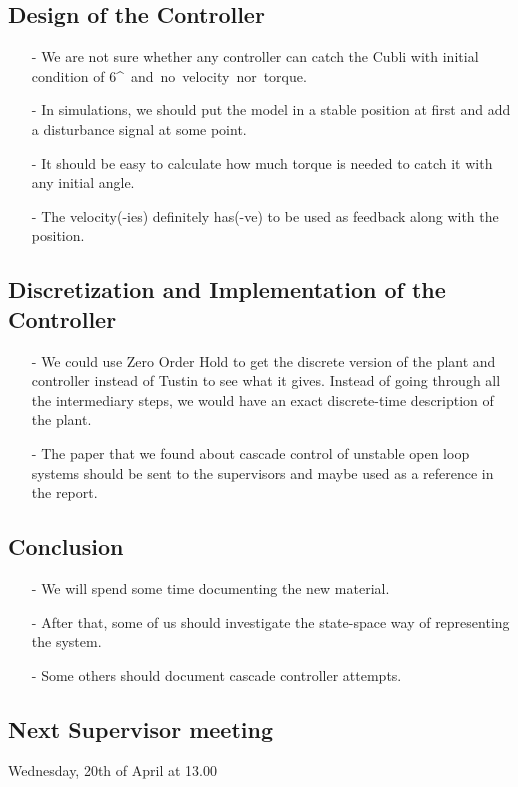 \subsection{Design of the Controller}
\begin{itemize}
  \item[-] We are not sure whether any controller can catch the Cubli with initial condition of 6\si{^{\circ}} and no velocity nor torque.
  \item[-] In simulations, we should put the model in a stable position at first and add a disturbance signal at some point.
  \item[-] It should be easy to calculate how much torque is needed to catch it with any initial angle.
  \item[-] The velocity(-ies) definitely has(-ve) to be used as feedback along with the position. 
\end{itemize}

\subsection{Discretization and Implementation of the Controller}
\begin{itemize}
  \item[-] We could use Zero Order Hold to get the discrete version of the plant and controller instead of Tustin to see what it gives. Instead of going through all the intermediary steps, we would have an exact discrete-time description of the plant.
  \item[-] The paper that we found about cascade control of unstable open loop systems should be sent to the supervisors and maybe used as a reference in the report.
\end{itemize}

\subsection{Conclusion}
\begin{itemize}
  \item[-] We will spend some time documenting the new material.
  \item[-] After that, some of us should investigate the state-space way of representing the system.
  \item[-] Some others should document cascade controller attempts.
\end{itemize}

\subsection{Next Supervisor meeting}
Wednesday, 20th of April at 13.00

